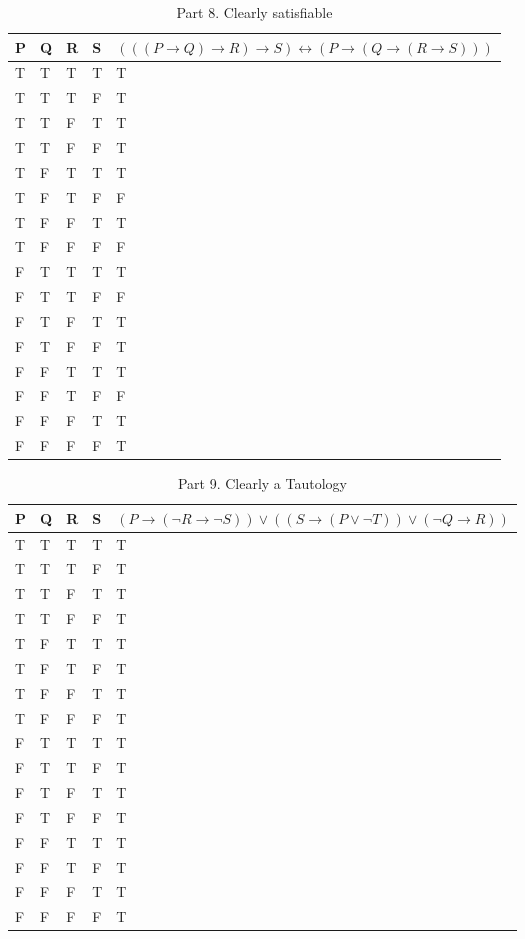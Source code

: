 \documentclass[12pt]{article}
\newenvironment{solution}[2][Solution]{ \begin{trivlist}
\item[\hskip \labelsep {\bfseries #1}]}{\end{trivlist}}
\begin{document}
\begin{solution}{2}
\pagebreak

\begin{table}[!h]
\centering
\caption{Part 8. Clearly satisfiable}
\label{my-label}
\begin{tabular}{|l|l|l|l|l|}
\hline
P & Q & R & S & $(((P \rightarrow Q) \rightarrow R) \rightarrow S) \leftrightarrow (P \rightarrow (Q \rightarrow (R \rightarrow S)))$ \\ \hline
T & T & T & T & T \\ \hline
T & T & T & F & T \\ \hline
T & T & F & T & T \\ \hline
T & T & F & F & T \\ \hline
T & F & T & T & T \\ \hline
T & F & T & F & F \\ \hline
T & F & F & T & T \\ \hline
T & F & F & F & F \\ \hline
F & T & T & T & T \\ \hline
F & T & T & F & F \\ \hline
F & T & F & T & T \\ \hline
F & T & F & F & T \\ \hline
F & F & T & T & T \\ \hline
F & F & T & F & F \\ \hline
F & F & F & T & T \\ \hline
F & F & F & F & T \\ \hline
\end{tabular}
\end{table}

\begin{table}[!h]
\centering
\caption{Part 9. Clearly a Tautology}
\label{my-label}
\begin{tabular}{|l|l|l|l|l|}
\hline
P & Q & R & S & $(P \rightarrow (\lnot R \rightarrow \lnot S)) \vee ((S \rightarrow (P \vee \lnot T)) \vee (\lnot Q \rightarrow R))$ \\ \hline
T & T & T & T & T \\ \hline
T & T & T & F & T \\ \hline
T & T & F & T & T \\ \hline
T & T & F & F & T \\ \hline
T & F & T & T & T \\ \hline
T & F & T & F & T \\ \hline
T & F & F & T & T \\ \hline
T & F & F & F & T \\ \hline
F & T & T & T & T \\ \hline
F & T & T & F & T \\ \hline
F & T & F & T & T \\ \hline
F & T & F & F & T \\ \hline
F & F & T & T & T \\ \hline
F & F & T & F & T \\ \hline
F & F & F & T & T \\ \hline
F & F & F & F & T \\ \hline
\end{tabular}
\end{table}


\end{solution}
\end{document}
